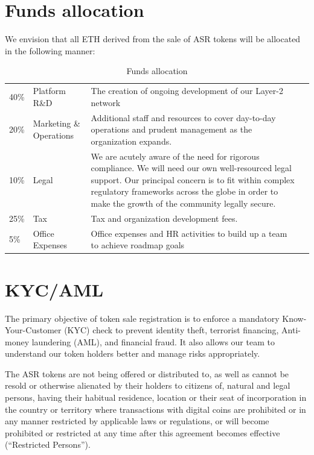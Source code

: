 \section{Funds allocation}

We envision that all ETH derived from the sale of ASR tokens will be allocated in the following manner:
\newline\newline


\begin{table}[H]
\begin{tabular}{llp{}l}
  40\% & Platform R\&D & The creation of ongoing development of our Layer-2 network \\
  20\% & Marketing \& Operations & Additional staff and resources to cover day-to-day operations and prudent management as the organization expands. \\
  10\% & Legal & We are acutely aware of the need for rigorous compliance. We will need our own well-resourced legal support. Our principal concern is to fit within complex regulatory frameworks across the globe in order to make the growth of the community legally secure. \\
  25\% & Tax & Tax and organization development fees.\\
  5\% & Office Expenses & Office expenses and HR activities to build up
        a team to achieve roadmap goals
\end{tabular}
\caption{\label{tab:table-name}Funds allocation}
\end{table}

\section{KYC/AML}

The primary objective of token sale registration is to enforce a mandatory Know-Your-Customer (KYC) check to prevent identity theft, terrorist financing, Anti-money laundering (AML), and financial fraud. It also allows our team to understand our token holders better and manage risks appropriately.

The ASR tokens are not being offered or distributed to, as well as cannot be resold or otherwise alienated by their holders to citizens of, natural and legal persons, having their habitual residence, location or their seat of incorporation in the country or territory where transactions with digital coins are prohibited or in any manner restricted by applicable laws or regulations, or will become prohibited or restricted at any time after this agreement becomes effective (“Restricted Persons”).

